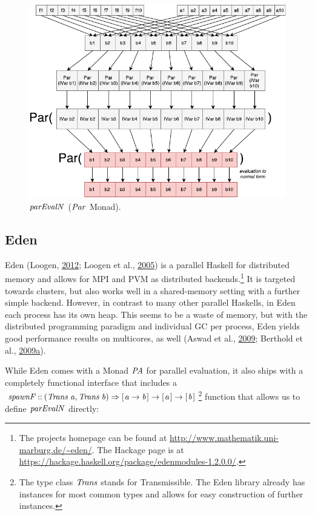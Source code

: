 \documentclass[paper=A4,twoside=true,openright,parskip=full,chapterprefix=true,headings=normal,bibliography=totoc,listof=totoc,titlepage=on,captions=tableabove,draft=false,british]{scrreprt}%
\begin{document}
\begin{figure}
\centering
\includegraphics{src/img/parEvalNParMonadImg.pdf}
\caption{\ensuremath{\Varid{parEvalN}} (\ensuremath{\Conid{Par}} Monad).\label{fig:parEvalNParMonadImg}}
\end{figure}

\hypertarget{eden}{%
\subsection{Eden}\label{eden}}

\label{sec:EdenIntro}

Eden (Loogen, \protect\hyperlink{ref-Loogen2012}{2012}; Loogen et al.,
\protect\hyperlink{ref-eden}{2005}) is a parallel Haskell for
distributed memory and allows for MPI and PVM as distributed
backends.\footnote{The projects homepage can be found at
  \url{http://www.mathematik.uni-marburg.de/~eden/}. The Hackage page is
  at \url{https://hackage.haskell.org/package/edenmodules-1.2.0.0/}.} It
is targeted towards clusters, but also works well in a shared-memory
setting with a further simple backend. However, in contrast to many
other parallel Haskells, in Eden each process has its own heap. This
seems to be a waste of memory, but with the distributed programming
paradigm and individual GC per process, Eden yields good performance
results on multicores, as well (Aswad et al.,
\protect\hyperlink{ref-aswad2009low}{2009}; Berthold et al.,
\protect\hyperlink{ref-arcs-dc}{2009}\protect\hyperlink{ref-arcs-dc}{a}).

While Eden comes with a Monad \ensuremath{\Conid{PA}} for parallel evaluation, it also
ships with a completely functional interface that includes a
\ensuremath{\Varid{spawnF}\mathbin{::}(\Conid{Trans}\;\Varid{a},\Conid{Trans}\;\Varid{b})\Rightarrow [\mskip1.5mu \Varid{a}\to \Varid{b}\mskip1.5mu]\to [\mskip1.5mu \Varid{a}\mskip1.5mu]\to [\mskip1.5mu \Varid{b}\mskip1.5mu]}\footnote{The
  type class \ensuremath{\Conid{Trans}} stands for Transmissible. The Eden library already
  has instances for most common types and allows for easy construction
  of further instances.} function that allows us to define \ensuremath{\Varid{parEvalN}}
directly:
\end{document}
